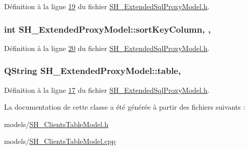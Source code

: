 Définition à la ligne \hyperlink{SH__ExtendedSqlProxyModel_8h_source_l00019}{19} du fichier \hyperlink{SH__ExtendedSqlProxyModel_8h_source}{S\-H\-\_\-\-Extended\-Sql\-Proxy\-Model.\-h}.

\hypertarget{classSH__ExtendedProxyModel_a47e2d0b99b84fb066438db667dd1ad26}{
\subsubsection[{sort\-Key\-Column}]{\setlength{\rightskip}{0pt plus 5cm}int S\-H\-\_\-\-Extended\-Proxy\-Model\-::sort\-Key\-Column\hspace{0.3cm}{\ttfamily [read]}, {\ttfamily [write]}, {\ttfamily [inherited]}}}\label{classSH__ExtendedProxyModel_a47e2d0b99b84fb066438db667dd1ad26}


Définition à la ligne \hyperlink{SH__ExtendedSqlProxyModel_8h_source_l00020}{20} du fichier \hyperlink{SH__ExtendedSqlProxyModel_8h_source}{S\-H\-\_\-\-Extended\-Sql\-Proxy\-Model.\-h}.

\hypertarget{classSH__ExtendedProxyModel_a7eef4557a77444e9ce5c24c180392bfa}{
\subsubsection[{table}]{\setlength{\rightskip}{0pt plus 5cm}Q\-String S\-H\-\_\-\-Extended\-Proxy\-Model\-::table\hspace{0.3cm}{\ttfamily [read]}, {\ttfamily [inherited]}}}\label{classSH__ExtendedProxyModel_a7eef4557a77444e9ce5c24c180392bfa}


Définition à la ligne \hyperlink{SH__ExtendedSqlProxyModel_8h_source_l00017}{17} du fichier \hyperlink{SH__ExtendedSqlProxyModel_8h_source}{S\-H\-\_\-\-Extended\-Sql\-Proxy\-Model.\-h}.



La documentation de cette classe a été générée à partir des fichiers suivants \-:\begin{DoxyCompactItemize}
\item 
models/\hyperlink{SH__ClientsTableModel_8h}{S\-H\-\_\-\-Clients\-Table\-Model.\-h}\item 
models/\hyperlink{SH__ClientsTableModel_8cpp}{S\-H\-\_\-\-Clients\-Table\-Model.\-cpp}\end{DoxyCompactItemize}
